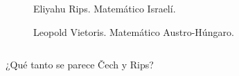 \documentclass{beamer}
\begin{document}
\begin{frame}
\begin{columns}
  \begin{figure}[H]
    \begin{overprint}
      \centering{}
      \caption{Eliyahu Rips. Matemático Israelí.}
      \centering{}
      \caption{Leopold Vietoris. Matemático Austro-Húngaro.}
    \end{overprint}
  \end{figure}
\end{columns}
\end{frame}

\begin{frame}
  \begin{center}
    ¿Qué tanto se parece \v{C}ech y Rips?
  \end{center}
\end{frame}
\end{document}
